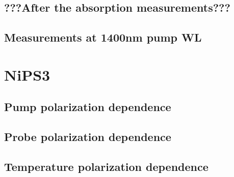 \subsection{???After the absorption measurements???}
\subsection{Measurements at 1400nm pump WL}


\section{NiPS3}
\subsection{Pump polarization dependence}
\subsection{Probe polarization dependence}
\subsection{Temperature polarization dependence}


